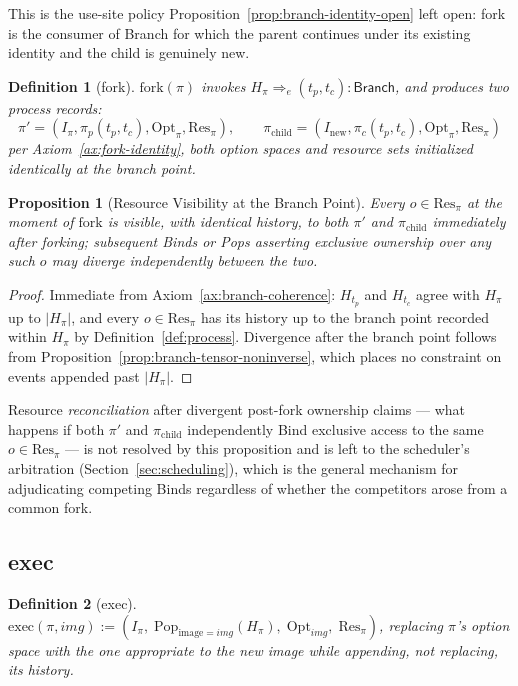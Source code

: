 \documentclass[11pt]{article}
\newtheorem{definition}{Definition}[section]
\newtheorem{proposition}{Proposition}[section]
\begin{document}
This is the use-site policy Proposition~\ref{prop:branch-identity-open} left open: fork is the consumer of Branch for which the parent continues under its existing identity and the child is genuinely new.

\begin{definition}[fork]
\label{def:fork}
$\mathrm{fork}(\pi)$ invokes $H_\pi \Longrightarrow_e (t_p,t_c) : \mathsf{Branch}$, and produces two process records:
\[
\pi' = (I_\pi, \pi_p(t_p,t_c), \mathrm{Opt}_\pi, \mathrm{Res}_\pi), \qquad
\pi_{\mathrm{child}} = (I_{\mathrm{new}}, \pi_c(t_p,t_c), \mathrm{Opt}_\pi, \mathrm{Res}_\pi)
\]
per Axiom~\ref{ax:fork-identity}, both option spaces and resource sets initialized identically at the branch point.
\end{definition}

\begin{proposition}[Resource Visibility at the Branch Point]
\label{prop:fork-resource-visibility}
Every $o \in \mathrm{Res}_\pi$ at the moment of $\mathrm{fork}$ is visible, with identical history, to both $\pi'$ and $\pi_{\mathrm{child}}$ immediately after forking; subsequent Binds or Pops asserting exclusive ownership over any such $o$ may diverge independently between the two.
\end{proposition}
\begin{proof}
Immediate from Axiom~\ref{ax:branch-coherence}: $H_{t_p}$ and $H_{t_c}$ agree with $H_\pi$ up to $|H_\pi|$, and every $o \in \mathrm{Res}_\pi$ has its history up to the branch point recorded within $H_\pi$ by Definition~\ref{def:process}. Divergence after the branch point follows from Proposition~\ref{prop:branch-tensor-noninverse}, which places no constraint on events appended past $|H_\pi|$.
\end{proof}

Resource \emph{reconciliation} after divergent post-fork ownership claims --- what happens if both $\pi'$ and $\pi_{\mathrm{child}}$ independently Bind exclusive access to the same $o \in \mathrm{Res}_\pi$ --- is not resolved by this proposition and is left to the scheduler's arbitration (Section~\ref{sec:scheduling}), which is the general mechanism for adjudicating competing Binds regardless of whether the competitors arose from a common fork.

\subsection{exec}

\begin{definition}[exec]
\label{def:exec}
$\mathrm{exec}(\pi, \mathit{img}) := (I_\pi,\; \mathrm{Pop}_{\mathrm{image}=\mathit{img}}(H_\pi),\; \mathrm{Opt}_{\mathit{img}},\; \mathrm{Res}_\pi)$, replacing $\pi$'s option space with the one appropriate to the new image while appending, not replacing, its history.
\end{definition}
\end{document}
